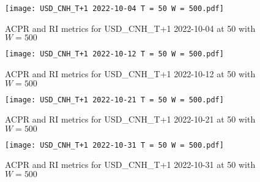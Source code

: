         \begin{figure}[htbp]
            \texttt{[image: USD\_CNH\_T+1 2022-10-04 T = 50 W = 500.pdf]}
            \caption{ACPR and RI metrics for USD\_CNH\_T+1 2022-10-04 at 50 with $W = 500$}
        \end{figure}
        
        \begin{figure}[htbp]
            \texttt{[image: USD\_CNH\_T+1 2022-10-12 T = 50 W = 500.pdf]}
            \caption{ACPR and RI metrics for USD\_CNH\_T+1 2022-10-12 at 50 with $W = 500$}
        \end{figure}
        
        \begin{figure}[htbp]
            \texttt{[image: USD\_CNH\_T+1 2022-10-21 T = 50 W = 500.pdf]}
            \caption{ACPR and RI metrics for USD\_CNH\_T+1 2022-10-21 at 50 with $W = 500$}
        \end{figure}
        
        \begin{figure}[htbp]
            \texttt{[image: USD\_CNH\_T+1 2022-10-31 T = 50 W = 500.pdf]}
            \caption{ACPR and RI metrics for USD\_CNH\_T+1 2022-10-31 at 50 with $W = 500$}
        \end{figure}